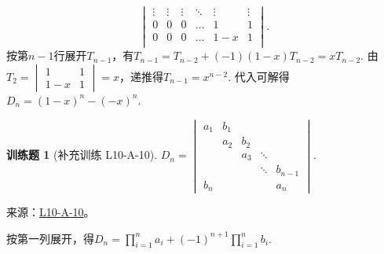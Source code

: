 \documentclass[UTF8,12pt,a4paper,fontset=fandol]{ctexart}
\newtheorem{exercise}{训练题}[section]
\begin{document}
\begin{solve}
\[\begin{vmatrix}
                    \vdots & \vdots & \vdots & \ddots & \vdots & \vdots \\
                    0      & 0      & 0      & \ldots & 1      & 1      \\
                    0      & 0      & 0      & \ldots & 1-x    & 1      \\
                \end{vmatrix}.\]
            按第$n-1$行展开$T_{n-1}$，有$T_{n-1}=T_{n-2}+(-1)(1-x)T_{n-2}=xT_{n-2}$. 由$T_2=\begin{vmatrix}
                    1&1\\1-x&1\end{vmatrix}=x$，递推得$T_{n-1}=x^{n-2}$. 代入可解得$D_n=(1-x)^n-(-x)^n$.
\end{solve}

\begin{exercise}[补充训练 L10-A-10]\label{prob:L10-A-10}
$ D_n=\begin{vmatrix}
                a_1 & b_1 &     &        &         \\
                    & a_2 & b_2 &        &         \\
                    &     & a_3 & \ddots &         \\
                    &     &     & \ddots & b_{n-1} \\
                b_n &     &     &        & a_n
            \end{vmatrix}$.
\end{exercise}
\noindent 来源：\href{https://github.com/yhwu-is/Linear-Algebra-Left-Undone/blob/new/%E8%AE%B2%E4%B9%89/%E4%B8%93%E9%A2%98/10%20%E8%A1%8C%E5%88%97%E5%BC%8F.tex}{L10-A-10}。
\begin{solve}
按第一列展开，得$D_n=\displaystyle\prod_{i=1}^na_i+(-1)^{n+1}\prod_{i=1}^nb_i$.
\end{solve}
\end{document}
